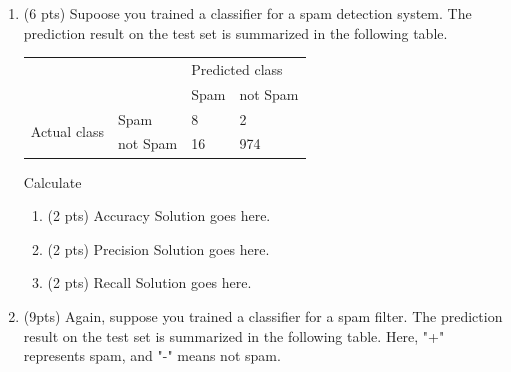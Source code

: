 \documentclass[a4paper]{article}
\theoremstyle{definition}
\newenvironment{soln}{
    \leavevmode\color{blue}\ignorespaces
}{}
\begin{document}
\begin{enumerate}
	\item (6 pts) Supoose you trained a classifier for a spam detection system. The prediction result on the test set is summarized in the following table.
	      \begin{center}
		      \begin{tabular}{l l | l l}
			                                    &          & \multicolumn{2}{l}{Predicted class}            \\
			                                    &          & Spam                                & not Spam \\
			      \hline
			      \multirow{2}{*}{Actual class} & Spam     & 8                                   & 2        \\
			                                    & not Spam & 16                                  & 974
		      \end{tabular}
	      \end{center}

	      Calculate
	      \begin{enumerate}
		      \item (2 pts) Accuracy
		            \begin{soln}  Solution goes here. \end{soln}
		      \item (2 pts) Precision
		            \begin{soln}  Solution goes here. \end{soln}
		      \item (2 pts) Recall
		            \begin{soln}  Solution goes here. \end{soln}
	      \end{enumerate}


	\item (9pts) Again, suppose you trained a classifier for a spam filter. The prediction result on the test set is summarized in the following table. Here, "+" represents spam, and "-" means not spam.


\end{enumerate}
\end{document}
